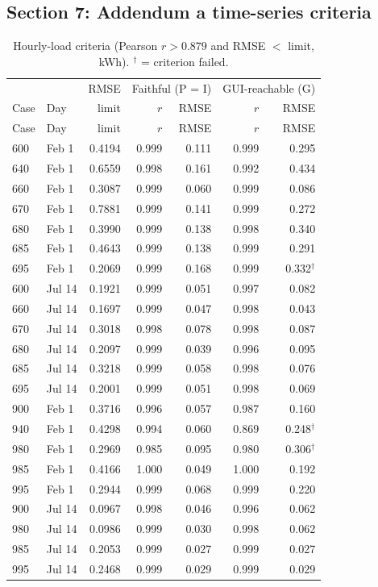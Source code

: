 \documentclass[10pt,a4paper]{article}
\begin{document}
\subsection{Section 7: Addendum a time-series criteria}
{\small
\begin{longtable}{llrrrrr}
\caption{Hourly-load criteria (Pearson $r > 0.879$ and RMSE $<$ limit, kWh). $^{\dagger}$ = criterion failed.}\label{tab:series}\\
\toprule & & RMSE & \multicolumn{2}{c}{Faithful (P = I)} & \multicolumn{2}{c}{GUI-reachable (G)}\\
Case & Day & limit & $r$ & RMSE & $r$ & RMSE\\\midrule\endfirsthead
\toprule Case & Day & limit & $r$ & RMSE & $r$ & RMSE\\\midrule\endhead
600 & Feb 1 & 0.4194 & 0.999 & 0.111 & 0.999 & 0.295 \\
640 & Feb 1 & 0.6559 & 0.998 & 0.161 & 0.992 & 0.434 \\
660 & Feb 1 & 0.3087 & 0.999 & 0.060 & 0.999 & 0.086 \\
670 & Feb 1 & 0.7881 & 0.999 & 0.141 & 0.999 & 0.272 \\
680 & Feb 1 & 0.3990 & 0.999 & 0.138 & 0.998 & 0.340 \\
685 & Feb 1 & 0.4643 & 0.999 & 0.138 & 0.999 & 0.291 \\
695 & Feb 1 & 0.2069 & 0.999 & 0.168 & 0.999 & 0.332$^{\dagger}$ \\
600 & Jul 14 & 0.1921 & 0.999 & 0.051 & 0.997 & 0.082 \\
660 & Jul 14 & 0.1697 & 0.999 & 0.047 & 0.998 & 0.043 \\
670 & Jul 14 & 0.3018 & 0.998 & 0.078 & 0.998 & 0.087 \\
680 & Jul 14 & 0.2097 & 0.999 & 0.039 & 0.996 & 0.095 \\
685 & Jul 14 & 0.3218 & 0.999 & 0.058 & 0.998 & 0.076 \\
695 & Jul 14 & 0.2001 & 0.999 & 0.051 & 0.998 & 0.069 \\
900 & Feb 1 & 0.3716 & 0.996 & 0.057 & 0.987 & 0.160 \\
940 & Feb 1 & 0.4298 & 0.994 & 0.060 & 0.869 & 0.248$^{\dagger}$ \\
980 & Feb 1 & 0.2969 & 0.985 & 0.095 & 0.980 & 0.306$^{\dagger}$ \\
985 & Feb 1 & 0.4166 & 1.000 & 0.049 & 1.000 & 0.192 \\
995 & Feb 1 & 0.2944 & 0.999 & 0.068 & 0.999 & 0.220 \\
900 & Jul 14 & 0.0967 & 0.998 & 0.046 & 0.996 & 0.062 \\
980 & Jul 14 & 0.0986 & 0.999 & 0.030 & 0.998 & 0.062 \\
985 & Jul 14 & 0.2053 & 0.999 & 0.027 & 0.999 & 0.027 \\
995 & Jul 14 & 0.2468 & 0.999 & 0.029 & 0.999 & 0.029 \\
\bottomrule
\end{longtable}}
\end{document}
